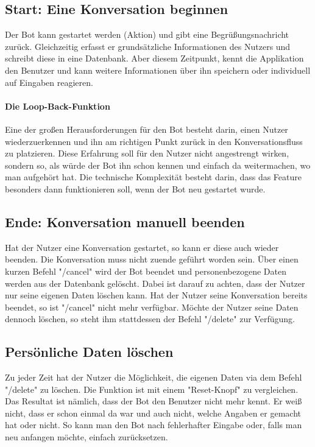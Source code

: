         \subsection{Start: Eine Konversation beginnen}
            Der Bot kann gestartet werden (Aktion) und gibt eine Begrüßungsnachricht zurück. Gleichzeitig erfasst er grundsätzliche Informationen des Nutzers und schreibt diese in eine Datenbank. Aber diesem Zeitpunkt, kennt die Applikation den Benutzer und kann weitere Informationen über ihn speichern oder individuell auf Eingaben reagieren.

            \paragraph{Die Loop-Back-Funktion}
                Eine der großen Herausforderungen für den Bot besteht darin, einen Nutzer wiederzuerkennen und ihn am richtigen Punkt zurück in den Konversationsfluss zu platzieren. Diese Erfahrung soll für den Nutzer nicht angestrengt wirken, sondern so, als würde der Bot ihn schon kennen und einfach da weitermachen, wo man aufgehört hat. Die technische Komplexität besteht darin, dass das Feature besonders dann funktionieren soll, wenn der Bot neu gestartet wurde.

        \subsection{Ende: Konversation manuell beenden}
            Hat der Nutzer eine Konversation gestartet, so kann er diese auch wieder beenden. Die Konversation muss nicht zuende geführt worden sein. Über einen kurzen Befehl "/cancel" wird der Bot beendet und personenbezogene Daten werden aus der Datenbank gelöscht. Dabei ist darauf zu achten, dass der Nutzer nur seine eigenen Daten löschen kann. Hat der Nutzer seine Konversation bereits beendet, so ist "/cancel" nicht mehr verfügbar. Möchte der Nutzer seine Daten dennoch löschen, so steht ihm stattdessen der Befehl "/delete" zur Verfügung.

        \subsection{Persönliche Daten löschen}
            Zu jeder Zeit hat der Nutzer die Möglichkeit, die eigenen Daten via dem Befehl "/delete" zu löschen. Die Funktion ist mit einem "Reset-Knopf" zu vergleichen. Das Resultat ist nämlich, dass der Bot den Benutzer nicht mehr kennt. Er weiß nicht, dass er schon einmal da war und auch nicht, welche Angaben er gemacht hat oder nicht. So kann man den Bot nach fehlerhafter Eingabe oder, falls man neu anfangen möchte, einfach zurücksetzen.

